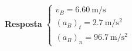 \textbf{Resposta}
$
\begin{cases}
v_{B}=\SI{6.60}{\meter/\second}\\
(a_{B})_{t}=\SI{2.7}{\meter/\second^{2}}\\
(a_{B})_{n}=\SI{96.7}{\meter/\second^{2}}
\end{cases}
$
